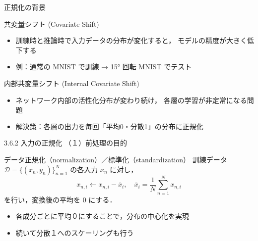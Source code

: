 \documentclass[dvipdfmx,autodetect-engine]{beamer}
\begin{document}
\begin{frame}{正規化の背景}
  \begin{block}{共変量シフト (Covariate Shift)}
    \begin{itemize}
      \item 訓練時と推論時で入力データの分布が変化すると，  
            モデルの精度が大きく低下する
      \item 例：通常の MNIST で訓練 → 15° 回転 MNIST でテスト  
    \end{itemize}
  \end{block}
  \begin{block}{内部共変量シフト (Internal Covariate Shift)}
    \begin{itemize}
      \item ネットワーク内部の活性化分布が変わり続け，  
            各層の学習が非定常になる問題
      \item 解決策：各層の出力を毎回「平均0・分散1」の分布に正規化  
    \end{itemize}
  \end{block}
\end{frame}



\begin{frame}{3.6.2 入力の正規化 （１）前処理の目的}
  \begin{block}{データ正規化（normalization）／標準化（standardization）}
    訓練データ 
    $\mathcal{D} = \{(x_n,y_n)\}_{n=1}^N$ 
    の各入力 $x_n$ に対し，
    \[
      x_{n,i} \leftarrow x_{n,i} - \bar{x}_i
      ,\quad
      \bar{x}_i = \frac{1}{N}\sum_{n=1}^N x_{n,i}
    \]
    を行い，変換後の平均を 0 にする．
  \end{block}
  \begin{itemize}
    \item 各成分ごとに平均０にすることで，分布の中心化を実現
    \item 続いて分散１へのスケーリングも行う
  \end{itemize}
\end{frame}
\end{document}
